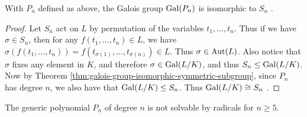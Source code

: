 %
%


\begin{lemma}\label{lemma:galois-symmetric}
	With $P_n$ defined as above, the Galois group $\operatorname{Gal}(P_n)$ is isomorphic to $S_n$ \cite{galois-lecture-polynomials} \cite{commutative-algebra-uon}.
\end{lemma}

\begin{proof}
	
	Let $S_n$ act on $L$ by permutation of the variables $t_1,...,t_n$. Thus if we have $\sigma \in S_n$, then for any $f(t_1,\dots,t_n) \in L $, we have 
	$   \sigma( f(t_1, \dots, t_n) )=f( t_{\sigma(1)},\dots,t_{\sigma(n)}) \in L. $
	Thus $\sigma \in \operatorname{Aut}(L)$.  Also notice that $\sigma$ fixes any element in $K$, and therefore
	 $\sigma \in \operatorname{Gal}(L/K)$, and thus $S_n \le \operatorname{Gal}(L/K)$.  Now by Theorem \ref{thm:galois-group-isomorphic-symmetric-subgroup}, since $P_n$ has degree $n$, we also have that $\operatorname{Gal}(L/K) \le S_n$. Thus $\operatorname{Gal}(L/K) \cong S_n$ . 
	
%	
	
\end{proof}


\begin{theorem}\label{thm:abel-ruffini-thm}
	The generic polynomial $P_n$ of degree $n$ is not solvable by radicals for $n \geq 5$. 
\end{theorem}

